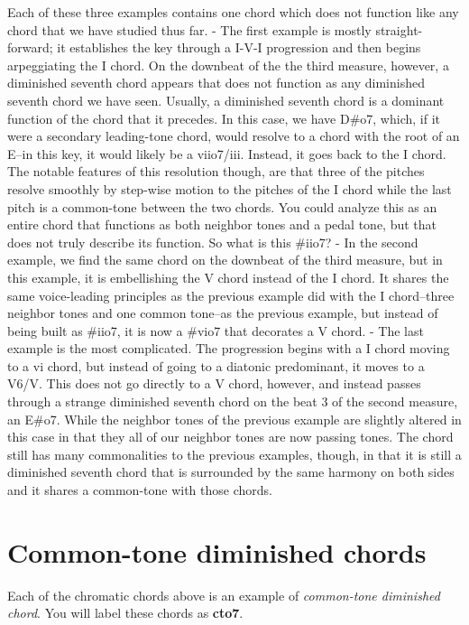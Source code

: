 \documentclass{book}
\begin{document}
Each of these three examples contains one chord which does not function like
any chord that we have studied thus far. - The first example is mostly
straight-forward; it establishes the key through a I-V-I progression and then
begins arpeggiating the I chord. On the downbeat of the the third measure,
however, a diminished seventh chord appears that does not function as any
diminished seventh chord we have seen. Usually, a diminished seventh chord is
a dominant function of the chord that it precedes. In this case, we have
D\#o7, which, if it were a secondary leading-tone chord, would resolve to a
chord with the root of an E--in this key, it would likely be a viio7/iii.
Instead, it goes back to the I chord. The notable features of this resolution
though, are that three of the pitches resolve smoothly by step-wise motion to
the pitches of the I chord while the last pitch is a common-tone between the
two chords. You could analyze this as an entire chord that functions as both
neighbor tones and a pedal tone, but that does not truly describe its
function. So what is this \#iio7? - In the second example, we find the same
chord on the downbeat of the third measure, but in this example, it is
embellishing the V chord instead of the I chord. It shares the same
voice-leading principles as the previous example did with the I chord--three
neighbor tones and one common tone--as the previous example, but instead of
being built as \#iio7, it is now a \#vio7 that decorates a V chord. - The last
example is the most complicated. The progression begins with a I chord moving
to a vi chord, but instead of going to a diatonic predominant, it moves to a
V6/V. This does not go directly to a V chord, however, and instead passes
through a strange diminished seventh chord on the beat 3 of the second
measure, an E\#o7. While the neighbor tones of the previous example are
slightly altered in this case in that they all of our neighbor tones are now
passing tones. The chord still has many commonalities to the previous
examples, though, in that it is still a diminished seventh chord that is
surrounded by the same harmony on both sides and it shares a common-tone with
those chords.

\hypertarget{common-tone-diminished-chords}{%
\section{Common-tone diminished chords}\label{common-tone-diminished-chords}}

Each of the chromatic chords above is an example of \emph{common-tone
diminished chord}. You will label these chords as \textbf{cto7}.
\end{document}
